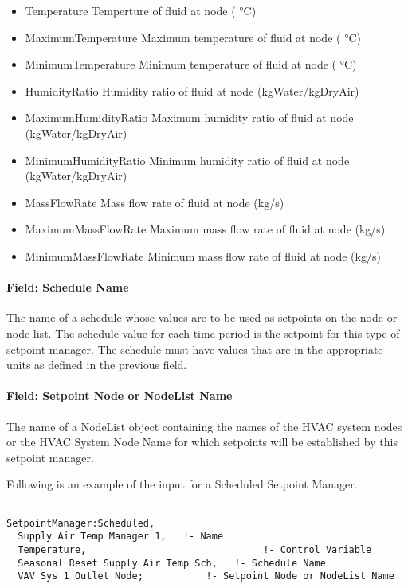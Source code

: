 \begin{itemize}
\item
  Temperature Temperture of fluid at node ( °C)
\item
  MaximumTemperature Maximum temperature of fluid at node ( °C)
\item
  MinimumTemperature Minimum temperature of fluid at node ( °C)
\item
  HumidityRatio Humidity ratio of fluid at node (kgWater/kgDryAir)
\item
  MaximumHumidityRatio Maximum humidity ratio of fluid at node (kgWater/kgDryAir)
\item
  MinimumHumidityRatio Minimum humidity ratio of fluid at node (kgWater/kgDryAir)
\item
  MassFlowRate Mass flow rate of fluid at node (kg/s)
\item
  MaximumMassFlowRate Maximum mass flow rate of fluid at node (kg/s)
\item
  MinimumMassFlowRate Minimum mass flow rate of fluid at node (kg/s)
\end{itemize}

\paragraph{Field: Schedule Name}\label{field-schedule-name-005}

The name of a schedule whose values are to be used as setpoints on the node or node list. The schedule value for each time period is the setpoint for this type of setpoint manager. The schedule must have values that are in the appropriate units as defined in the previous field.

\paragraph{Field: Setpoint Node or NodeList Name}\label{field-setpoint-node-or-nodelist-name}

The name of a NodeList object containing the names of the HVAC system nodes or the HVAC System Node Name for which setpoints will be established by this setpoint manager.

Following is an example of the input for a Scheduled Setpoint Manager.

\begin{lstlisting}

SetpointManager:Scheduled,
  Supply Air Temp Manager 1,   !- Name
  Temperature,                               !- Control Variable
  Seasonal Reset Supply Air Temp Sch,   !- Schedule Name
  VAV Sys 1 Outlet Node;           !- Setpoint Node or NodeList Name
\end{lstlisting}

